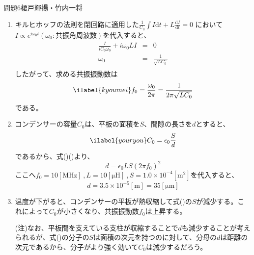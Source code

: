 \documentclass[fleqn]{jbook}
\newcommand{\md}{\mathrm{d}}
\begin{document}
\begin{answer}{問題6}{榎戸輝揚・竹内一将}
\begin{enumerate}
\item キルヒホッフの法則を閉回路に適用した$\frac{1}{C_0}\int I \md t+L \frac{\md I}{\md t}=0$
において$I\propto e^{i\omega _0 t}(\omega_0:\text{共振角周波数})$を代入すると、
\begin{eqnarray*}
\frac{I}{iC_0\omega _0}+i\omega_0 LI&=&0  \\
\omega_0&=&\frac{1}{\sqrt{LC_0}} \\
\end{eqnarray*}
したがって、求める共振振動数は
\begin{eqnarray}
\ilabel{kyoumei}
f_0=\frac{\omega_0}{2\pi}=\frac{1}{2\pi \sqrt{LC_0}}   
\end{eqnarray}
である。

\item コンデンサーの容量$C_0$は、平板の面積を$S$、間隙の長さを$d$とすると、
\begin{eqnarray}
 \ilabel{youryou}
C_0=\epsilon_0\frac{S}{d}  
\end{eqnarray}
であるから、式()()より、
\[
d=\epsilon_0LS(2\pi f_0)^2
\]
ここへ$f_0=10[\mathrm{MHz}] \ ,L=10[\mathrm{\mu H}] \ , S=1.0\times 10^{-4}[ \mathrm{m^2}]$を代入すると、
\[
d=3.5\times 10^{-5}[\mathrm{m}]=35[\mathrm{\mu m}]
\]

\item 温度が下がると、コンデンサーの平板が熱収縮して式()の$S$が減少する。これによって$C_0$が小さくなり、共振振動数$f_0$は上昇する。\par
(注)なお、平板間を支えている支柱が収縮することで$d$も減少することが考えられるが、式()の分子の$S$は面積の次元を持つのに対して、分母の$d$は距離の次元であるから、分子がより強く効いて$C_0$は減少するだろう。


\end{enumerate}
\end{answer}
\end{document}
